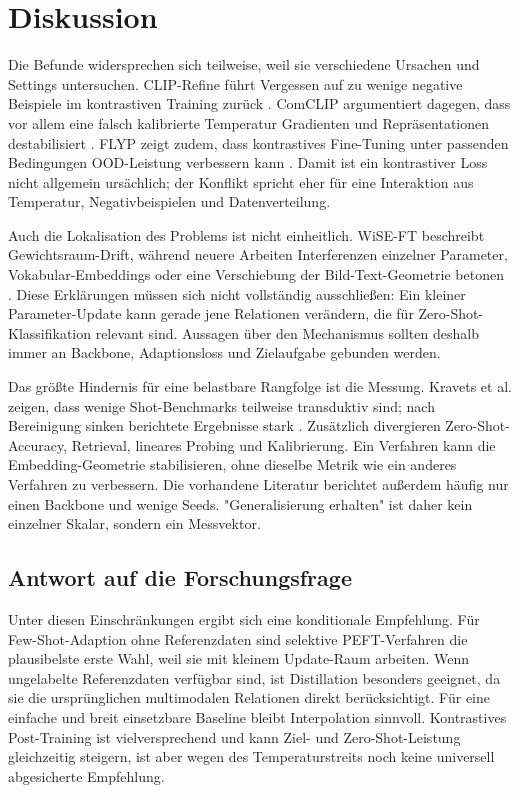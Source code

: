 \documentclass[conference]{IEEEtran}
\begin{document}
\section{Diskussion}
Die Befunde widersprechen sich teilweise, weil sie verschiedene Ursachen und
Settings untersuchen. CLIP-Refine führt Vergessen auf zu wenige negative
Beispiele im kontrastiven Training zurück \cite{clipprefine}. ComCLIP
argumentiert dagegen, dass vor allem eine falsch kalibrierte Temperatur
Gradienten und Repräsentationen destabilisiert \cite{comclip}. FLYP zeigt
zudem, dass kontrastives Fine-Tuning unter passenden Bedingungen OOD-Leistung
verbessern kann \cite{flyp}. Damit ist ein kontrastiver Loss nicht allgemein
ursächlich; der Konflikt spricht eher für eine Interaktion aus Temperatur,
Negativbeispielen und Datenverteilung.

Auch die Lokalisation des Problems ist nicht einheitlich. WiSE-FT beschreibt
Gewichtsraum-Drift, während neuere Arbeiten Interferenzen einzelner
Parameter, Vokabular-Embeddings oder eine Verschiebung der
Bild-Text-Geometrie betonen \cite{wisefit, svft, iimm}. Diese Erklärungen
müssen sich nicht vollständig ausschließen: Ein kleiner Parameter-Update kann
gerade jene Relationen verändern, die für Zero-Shot-Klassifikation relevant
sind. Aussagen über den Mechanismus sollten deshalb immer an Backbone,
Adaptionsloss und Zielaufgabe gebunden werden.

Das größte Hindernis für eine belastbare Rangfolge ist die Messung. Kravets
et al. zeigen, dass wenige Shot-Benchmarks teilweise transduktiv sind; nach
Bereinigung sinken berichtete Ergebnisse stark \cite{kravets}. Zusätzlich
divergieren Zero-Shot-Accuracy, Retrieval, lineares Probing und Kalibrierung.
Ein Verfahren kann die Embedding-Geometrie stabilisieren, ohne dieselbe
Metrik wie ein anderes Verfahren zu verbessern. Die vorhandene Literatur
berichtet außerdem häufig nur einen Backbone und wenige Seeds. "Generalisierung
erhalten" ist daher kein einzelner Skalar, sondern ein Messvektor.

\subsection{Antwort auf die Forschungsfrage}
Unter diesen Einschränkungen ergibt sich eine konditionale Empfehlung. Für
Few-Shot-Adaption ohne Referenzdaten sind selektive PEFT-Verfahren die
plausibelste erste Wahl, weil sie mit kleinem Update-Raum arbeiten. Wenn
ungelabelte Referenzdaten verfügbar sind, ist Distillation besonders
geeignet, da sie die ursprünglichen multimodalen Relationen direkt
berücksichtigt. Für eine einfache und breit einsetzbare Baseline bleibt
Interpolation sinnvoll. Kontrastives Post-Training ist vielversprechend und
kann Ziel- und Zero-Shot-Leistung gleichzeitig steigern, ist aber wegen des
Temperaturstreits noch keine universell abgesicherte Empfehlung.
\end{document}
